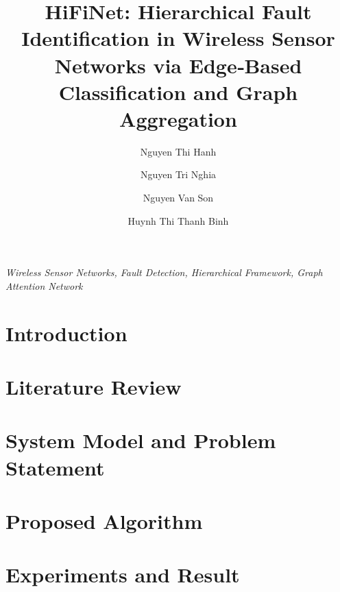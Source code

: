 \documentclass[preprint,12pt]{elsarticle}
\begin{document}
\begin{frontmatter}

\title{HiFiNet: Hierarchical Fault Identification in Wireless Sensor Networks via Edge‑Based Classification and Graph Aggregation}

\author[fidt:pnk]{Nguyen Thi Hanh}
\author[hust]{Nguyen Tri Nghia}
\author[fcs:pnk]{Nguyen Van Son}
\author[hust]{Huynh Thi Thanh Binh}
\address[fidt:pnk]{Faculty of Interdisciplinary Digital Technology (FIDT), PHENIKAA University, Vietnam}
\address[hust]{Hanoi University of Science and Technology, Vietnam}
\address[fcs:pnk]{Faculty of Computer Science, PHENIKAA University, Yen Nghia, Ha Dong, Hanoi 12116, Vietnam}



\begin{keyword}
\textit{Wireless Sensor Networks, Fault Detection, Hierarchical Framework, Graph Attention Network}
\end{keyword}

\end{frontmatter}

\section{Introduction}


\section{Literature Review}


\section{System Model and Problem Statement}


\section{Proposed Algorithm}


\section{Experiments and Result}


\clearpage

\end{document}
